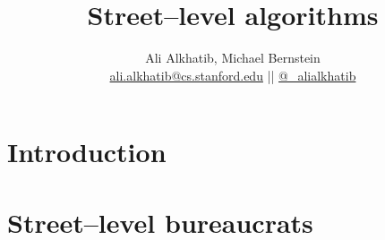 \documentclass[aspectratio=169,12pt]{beamer} %
\title{Street--level algorithms}
\subtitle{\onslide<2->{a theory to fill in the gaps between systems and people}}
\author{{Ali Alkhatib}, Michael Bernstein\\
\href{mailto:ali.alkhatib@cs.stanford.edu}{ali.alkhatib@cs.stanford.edu} ||
         \href{http://twitter.com/_alialkhatib}{@\_alialkhatib}}
\institute[Stanford]{Stanford HCI Group}
\date{\DTMusedate{talkDate}}
\newcommand{\onlyinsubfile}[1]{#1}
\newcommand{\notinsubfile}[1]{}
\begin{document}
\renewcommand{\onlyinsubfile}[1]{}
\renewcommand{\notinsubfile}[1]{#1}

\begin{frame}
\titlepage
\end{frame}




% 


\section{Introduction}


\section{Street--level bureaucrats}







% 

% 

% 



% 

% 


% 





\end{document}
